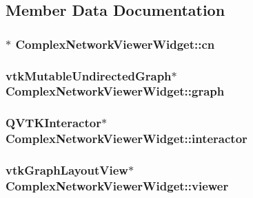 \subsection{Member Data Documentation}
\hypertarget{class_complex_network_viewer_widget_a589b99afee6ab49d60e94922546c38fc}{
\subsubsection[{cn}]{$\ast$ Complex\+Network\+Viewer\+Widget\+::cn\hspace{0.3cm}{\ttfamily [private]}}}\label{class_complex_network_viewer_widget_a589b99afee6ab49d60e94922546c38fc}
\hypertarget{class_complex_network_viewer_widget_a2ccd74a17620352941b4b19b97b20550}{
\subsubsection[{graph}]{\setlength{\rightskip}{0pt plus 5cm}vtk\+Mutable\+Undirected\+Graph$\ast$ Complex\+Network\+Viewer\+Widget\+::graph\hspace{0.3cm}{\ttfamily [private]}}}\label{class_complex_network_viewer_widget_a2ccd74a17620352941b4b19b97b20550}
\hypertarget{class_complex_network_viewer_widget_a7d25bd2946c21efa67c5c216eecaf410}{
\subsubsection[{interactor}]{\setlength{\rightskip}{0pt plus 5cm}Q\+V\+T\+K\+Interactor$\ast$ Complex\+Network\+Viewer\+Widget\+::interactor\hspace{0.3cm}{\ttfamily [private]}}}\label{class_complex_network_viewer_widget_a7d25bd2946c21efa67c5c216eecaf410}
\hypertarget{class_complex_network_viewer_widget_aa9af3e2514822eb4c0fb42da84f33470}{
\subsubsection[{viewer}]{\setlength{\rightskip}{0pt plus 5cm}vtk\+Graph\+Layout\+View$\ast$ Complex\+Network\+Viewer\+Widget\+::viewer\hspace{0.3cm}{\ttfamily [private]}}}\label{class_complex_network_viewer_widget_aa9af3e2514822eb4c0fb42da84f33470}

